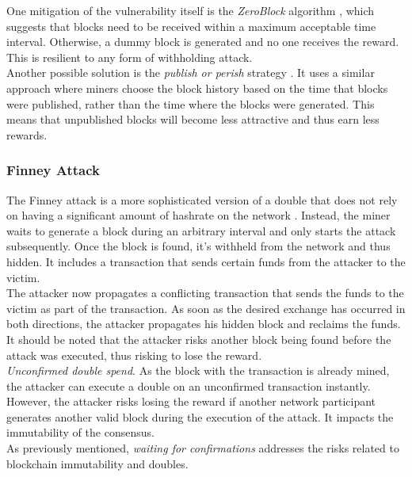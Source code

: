 \documentclass[12pt,a4paper]{article}
\begin{document}
One mitigation of the vulnerability itself is the \textit{ZeroBlock} algorithm \cite{zeroblock}, which suggests that blocks need to be received within a maximum acceptable time interval. Otherwise, a dummy block is generated and no one receives the reward. This is resilient to any form of withholding attack.\\

Another possible solution is the \textit{publish or perish} strategy \cite{perish}. It uses a similar approach where miners choose the block history based on the time that \glspl{block} were published, rather than the time where the \glspl{block} were generated. This means that unpublished \glspl{block} will become less attractive and thus earn less \glspl{reward}.

\subsubsection{Finney Attack}

The Finney attack is a more sophisticated version of a \gls{double} that does not rely on having a significant amount of \gls{hashrate} on the network \cite{survey}. Instead, the miner waits to generate a block during an arbitrary interval and only starts the attack subsequently. Once the block is found, it's withheld from the network and thus hidden. It includes a \gls{transaction} that sends certain funds from the attacker to the victim.\\

The attacker now propagates a conflicting \gls{transaction} that sends the funds to the victim as part of the \gls{transaction}. As soon as the desired exchange has occurred in both directions, the attacker propagates his hidden block and reclaims the funds. It should be noted that the attacker risks another block being found before the attack was executed, thus risking to lose the \gls{reward}.\\

\textit{Unconfirmed double spend}. As the block with the \gls{transaction} is already mined, the attacker can execute a \gls{double} on an unconfirmed \gls{transaction} instantly. However, the attacker risks losing the \gls{reward} if another network participant generates another valid block during the execution of the attack. It impacts the immutability of the \gls{consensus}.\\

As previously mentioned, \textit{waiting for confirmations} addresses the risks related to blockchain immutability and \glspl{double}.\\
\end{document}
